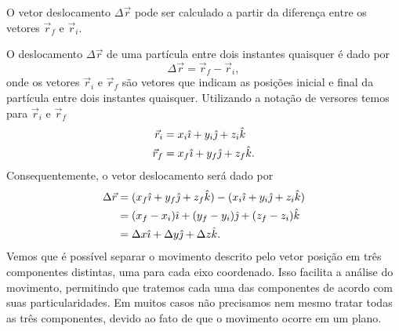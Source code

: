 \begin{marginfigure}
\centering
{}
\caption{O vetor deslocamento $\Delta \vec{r}$ pode ser calculado a partir da diferença entre os vetores $\vec{r}_f$ e $\vec{r}_i$.}
\end{marginfigure}

O deslocamento $\Delta \vec{r}$ de uma partícula entre dois instantes quaisquer é dado por
\begin{equation}
  \Delta\vec{r} = \vec{r}_f - \vec{r}_i,
\end{equation}
%
onde os vetores $\vec{r}_i$ e $\vec{r}_f$ são vetores que indicam as posições inicial e final da partícula entre dois instantes quaisquer. Utilizando a notação de versores temos para $\vec{r}_i$ e $\vec{r}_f$
\begin{align}
  \vec{r}_i &= x_i \hat{\imath} + y_i \hat{\jmath} + z_i \hat{k} \\
  \vec{r}_f &= x_f \hat{\imath} + y_f \hat{\jmath} + z_f \hat{k}.
\end{align}
%
Consequentemente, o vetor deslocamento será dado por
\begin{align}
  \Delta\vec{r} &= (x_f \hat{\imath} + y_f \hat{\jmath} + z_f \hat{k}) - (x_i \hat{\imath} + y_i \hat{\jmath} + z_i \hat{k}) \\
  &= (x_f - x_i)\hat{\imath} + (y_f - y_i)\hat{\jmath} + (z_f - z_i)\hat{k} \\
  &= \Delta x\hat{\imath} + \Delta y\hat{\jmath} + \Delta z\hat{k}.
\end{align}
%
Vemos que é possível separar o movimento descrito pelo vetor posição em três componentes distintas, uma para cada eixo coordenado. Isso facilita a análise do movimento, permitindo que tratemos cada uma das componentes de acordo com suas particularidades. Em muitos casos não precisamos nem mesmo tratar todas as três componentes, devido ao fato de que o movimento ocorre em um plano.
  
